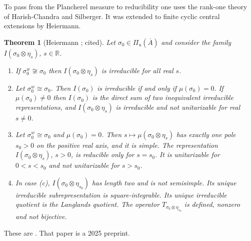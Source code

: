 \documentclass[12pt,letterpaper]{article}
\numberwithin{equation}{section}
\newtheorem{xtheorem}[theorem]{Theorem}
\theoremstyle{definition}
\newcommand{\cited}{cited}
\newcommand{\R}{\mathbb R}
\newcommand{\bA}{\overline{A}}
\begin{document}
To pass from the Plancherel measure to reducibility one uses the rank-one theory of
Harish-Chandra and Silberger.  It was extended to finite cyclic central extensions by
Heiermann.

\begin{xtheorem}[Heiermann {\cite{He25}}; \cited]\label{thm:rankone}
Let $\sigma_0\in\Pi_u(\bA)$ and consider the family $I(\sigma_0\otimes\eta_s)$, $s\in\R$.
\begin{enumerate}[label=(\alph*),leftmargin=*,itemsep=1pt]
\item If $\sigma_0^w\not\cong\sigma_0$ then $I(\sigma_0\otimes\eta_s)$ is irreducible for all
real $s$.
\item Let $\sigma_0^w\cong\sigma_0$.  Then $I(\sigma_0)$ is irreducible if and only if
$\mu(\sigma_0)=0$.  If $\mu(\sigma_0)\ne0$ then $I(\sigma_0)$ is the direct sum of two
inequivalent irreducible representations, and $I(\sigma_0\otimes\eta_s)$ is irreducible and
not unitarizable for real $s\ne0$.
\item Let $\sigma_0^w\cong\sigma_0$ and $\mu(\sigma_0)=0$.  Then $s\mapsto\mu(\sigma_0\otimes\eta_s)$
has exactly one pole $s_0>0$ on the positive real axis, and it is simple.  The
representation $I(\sigma_0\otimes\eta_s)$, $s>0$, is reducible only for $s=s_0$.  It is
unitarizable for $0<s<s_0$ and not unitarizable for $s>s_0$.
\item In case (c), $I(\sigma_0\otimes\eta_{s_0})$ has length two and is not semisimple.  Its
unique irreducible subrepresentation is square-integrable.  Its unique irreducible
quotient is the Langlands quotient.  The operator $T_{\sigma_0\otimes\eta_{s_0}}$ is defined,
nonzero and not bijective.
\end{enumerate}
\end{xtheorem}
These are \cite[Th\'eor\`eme~1.1, Proposition~2.4, Lemmes~3.1, 3.2, 3.4 and
Corollaire~3.5]{He25}.  That paper is a 2025 preprint.
\end{document}
